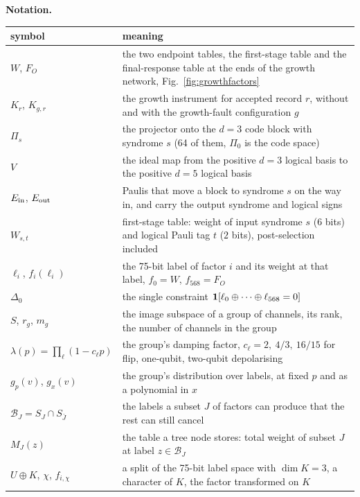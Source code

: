 \noindent\begin{minipage}{\linewidth}
\medskip\noindent\textbf{Notation.}\par\nopagebreak
{\color{black}
\begin{center}\small
\begin{tabular}{lp{11.5cm}}\toprule
symbol & meaning \\\midrule
$W$, $F_O$ & the two endpoint tables, the first-stage table and the final-response table at the ends of the growth network, Fig.~\ref{fig:growthfactors} \\
$K_r$, $K_{g,r}$ & the growth instrument for accepted record $r$, without and with the growth-fault configuration $g$ \\
$\Pi_s$ & the projector onto the $d=3$ code block with syndrome $s$ (64 of them, $\Pi_0$ is the code space) \\
$V$ & the ideal map from the positive $d=3$ logical basis to the positive $d=5$ logical basis \\
$E_{\rm in}$, $E_{\rm out}$ & Paulis that move a block to syndrome $s$ on the way in, and carry the output syndrome and logical signs \\
$W_{s,t}$ & first-stage table: weight of input syndrome $s$ ($6$ bits) and logical Pauli tag $t$ ($2$ bits), post-selection included \\
$\ell_i$, $f_i(\ell_i)$ & the 75-bit label of factor $i$ and its weight at that label, $f_0=W$, $f_{568}=F_O$ \\
$\Delta_0$ & the single constraint $\mathbf1\!\left[\ell_0\oplus\cdots\oplus\ell_{568}=0\right]$ \\
$S$, $r_g$, $m_g$ & the image subspace of a group of channels, its rank, the number of channels in the group \\
$\lambda(p)=\prod_\ell(1-c_\ell p)$ & the group's damping factor, $c_\ell=2,\ 4/3,\ 16/15$ for flip, one-qubit, two-qubit depolarising \\
$g_p(v)$, $g_x(v)$ & the group's distribution over labels, at fixed $p$ and as a polynomial in $x$ \\
$\mathcal B_J=S_J\cap S_{\bar J}$ & the labels a subset $J$ of factors can produce that the rest can still cancel \\
$M_J(z)$ & the table a tree node stores: total weight of subset $J$ at label $z\in\mathcal B_J$ \\
$U\oplus K$, $\chi$, $f_{i,\chi}$ & a split of the 75-bit label space with $\dim K=3$, a character of $K$, the factor transformed on $K$ \\
\bottomrule
\end{tabular}
\end{center}}
\end{minipage}

